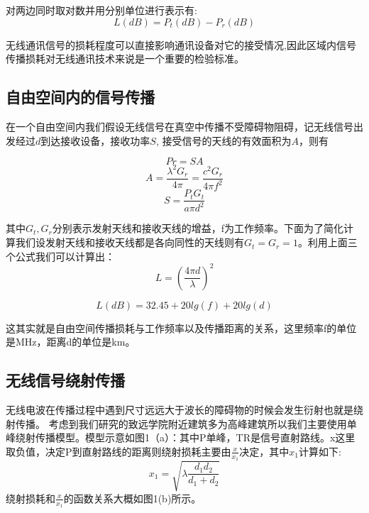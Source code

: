 \documentclass{article}
\begin{document}
   对两边同时取对数并用分别单位进行表示有:
   \begin{equation}
      L(dB) = P_t(dB) - P_r(dB)
   \end{equation}
   
   无线通讯信号的损耗程度可以直接影响通讯设备对它的接受情况,因此区域内信号传播损耗对无线通讯技术来说是一个重要的检验标准。
   
    \subsection{自由空间内的信号传播}
    在一个自由空间内我们假设无线信号在真空中传播不受障碍物阻碍，记无线信号出发经过$d$到达接收设备，接收功率$S$, 接受信号的天线的有效面积为$A$，则有
    
    \begin{equation}
        Pr = SA
    \end{equation}
     \begin{equation}
        A = \frac{\lambda^2G_r}{4\pi} = \frac{c^2G_r}{4\pi{f^2}}
    \end{equation}
     \begin{equation}
        S = \frac{P_tG_t}{a\pi{d^2}}
    \end{equation}
    
    其中$G_t,G_r$分别表示发射天线和接收天线的增益，f为工作频率。下面为了简化计算我们设发射天线和接收天线都是各向同性的天线则有$G_t=G_r=1$。利用上面三个公式我们可以计算出：
    \begin{equation}
        L = (\frac{4\pi{d}}{\lambda})^2
    \end{equation}
    
    \begin{equation}
        L(dB) = 32.45 + 20lg(f) + 20lg(d)
    \end{equation}
    
    这其实就是自由空间传播损耗与工作频率以及传播距离的关系，这里频率f的单位是MHz，距离d的单位是km。
    
    
    \subsection{无线信号绕射传播}
        无线电波在传播过程中遇到尺寸远远大于波长的障碍物的时候会发生衍射也就是绕射传播。
    考虑到我们研究的致远学院附近建筑多为高峰建筑所以我们主要使用单峰绕射传播模型。模型示意如图1（a）：其中P单峰，TR是信号直射路线。x这里取负值，决定P到直射路线的距离则绕射损耗主要由$\frac{x}{x_1}$决定，其中$x_1$计算如下:
        \begin{equation}
            x_1 = \sqrt{\lambda\frac{d_1d_2}{d_1+d_2}}
        \end{equation}
    绕射损耗和$\frac{x}{x_1}$的函数关系大概如图1(b)所示。
    
\end{document}
